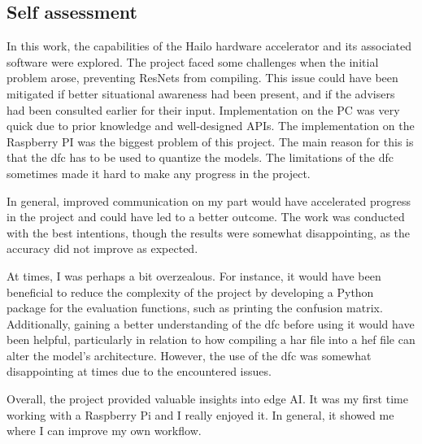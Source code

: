 \subsection*{Self assessment}
In this work, the capabilities of the Hailo hardware accelerator and its associated software were explored.
The project faced some challenges when the initial problem arose, preventing ResNets from compiling.
This issue could have been mitigated if better situational awareness had been present, and if the advisers had been consulted earlier for their input.
Implementation on the PC was very quick due to prior knowledge and well-designed APIs.
The implementation on the Raspberry PI was the biggest problem of this project.
The main reason for this is that the \acrshort{dfc} has to be used to quantize the models.
The limitations of the \acrshort{dfc} sometimes made it hard to make any progress in the project.

In general, improved communication on my part would have accelerated progress in the project and could have led to a better outcome.
The work was conducted with the best intentions, though the results were somewhat disappointing, as the accuracy did not improve as expected.

At times, I was perhaps a bit overzealous.
For instance, it would have been beneficial to reduce the complexity of the project by developing a Python package for the evaluation functions, such as printing the confusion matrix.
Additionally, gaining a better understanding of the \acrshort{dfc} before using it would have been helpful, particularly in relation to how compiling a \acrshort{har} file into a \acrshort{hef} file can alter the model's architecture.
However, the use of the \acrshort{dfc} was somewhat disappointing at times due to the encountered issues.

Overall, the project provided valuable insights into edge AI.
It was my first time working with a Raspberry Pi and I really enjoyed it.
In general, it showed me where I can improve my own workflow.

